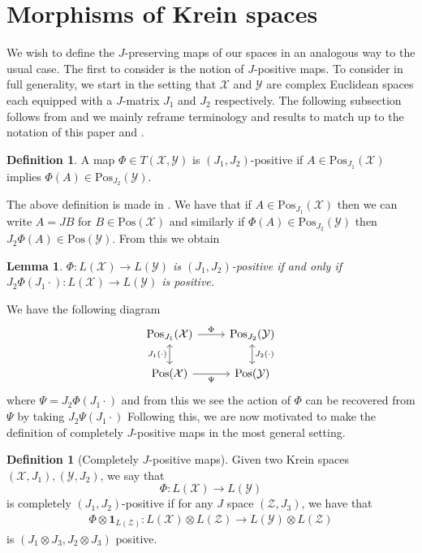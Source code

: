 \documentclass{amsart}
\numberwithin{equation}{section}
\newtheorem{lemma}[theorem]{Lemma}
\theoremstyle{definition}
\newtheorem{definition}[theorem]{Definition}
\theoremstyle{plain}
\theoremstyle{solutionstyle}
\begin{document}
\section{Morphisms of Krein spaces}\label{Krein section}
We wish to define the $J$-preserving maps of our  spaces in an analogous way to the usual case. 
The first to consider is the notion of $J$-positive maps. To consider in full generality, we start in the setting that $\mathcal{X}$ and $\mathcal{Y}$ are complex Euclidean spaces each equipped with a $J$-matrix $J_1$ and $J_2$ respectively. The following subsection follows from \cite{FelipeSosa2022} and we mainly reframe terminology and results to match up to the notation of this paper and \cite{Watrous_2018}.
\begin{definition}
    A map $\Phi\in T(\mathcal{X},\mathcal{Y})$ is $(J_1,J_2)$-positive if $A\in \mathrm{Pos}_{J_1}(\mathcal{X})$ implies $\Phi(A)\in \mathrm{Pos}_{J_2}(\mathcal{Y})$. 
\end{definition}
The above definition is made in \cite{FelipeSosa2022}.
We have that if $A\in \mathrm{Pos}_{J_1}(\mathcal{X})$ then we can write $A=JB$ for $B\in \mathrm{Pos}(\mathcal{X})$ and similarly if $\Phi(A)\in \mathrm{Pos}_{J_2}(\mathcal{Y})$ then $J_2\Phi(A)\in\mathrm{Pos}(\mathcal{Y})$. From this we obtain
\begin{lemma}
    $\Phi:L(\mathcal{X})\to L(\mathcal{Y})$ is $(J_1,J_2)$-positive if and only if $J_2\Phi(J_1\cdot):L(\mathcal{X})\to L(\mathcal{Y})$ is positive.
\end{lemma}
We have the following diagram 
\begin{equation*}
\begin{tikzcd}
\mathrm{Pos}_{J_1}(\mathcal{X})\arrow[r, "\Phi"] \arrow[d, <->, "J_1(\cdot)"'] & \mathrm{Pos}_{J_2}(\mathcal{Y}) \arrow[d, <->, "J_2(\cdot)"] \\
\mathrm{Pos}(\mathcal{X}) \arrow[r, "\Psi"'] & \mathrm{Pos}(\mathcal{Y})
\end{tikzcd}
\end{equation*}
where $\Psi=J_2\Phi(J_1\cdot)$ and from this we see the action of $\Phi$ can be recovered from $\Psi$ by taking $J_2\Psi(J_1\cdot)$
Following this, we are now motivated to make the definition of completely $J$-positive maps in the most general setting.
\begin{definition}[Completely $J$-positive maps]
Given two Krein spaces $(\mathcal{X},J_1), (\mathcal{Y}, J_2)$, we say that \begin{equation*}\Phi:L(\mathcal{X})\to L(\mathcal{Y})\end{equation*} is completely $(J_1,J_2)$-positive if for any $J$ space $(\mathcal{Z}, J_3)$, we have that 
\begin{align*}
    \Phi\otimes \mathbf{1}_{L(\mathcal{Z})}:L(\mathcal{X})\otimes L(\mathcal{Z}) \to L(\mathcal{Y})\otimes L(\mathcal{Z})
\end{align*} is $(J_1\otimes J_3, J_2\otimes J_3)$ positive.
\end{definition}
\end{document}
